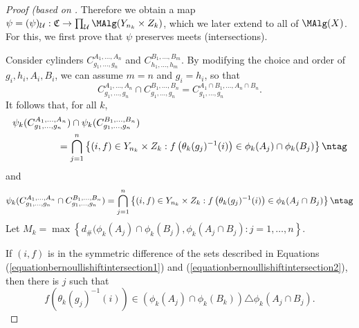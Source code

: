 \begin{proof}[Proof (based on \cite{ozawasoficnotes}]
Therefore we obtain a map $\psi=(\psi)_\mathcal{U}:\mathfrak{C}\to\prod_\mathcal{U}\MAlg(Y_{n_k}\times Z_k)$, which we later extend to all of $\MAlg(X)$. For this, we first prove that $\psi$ preserves meets (intersections).


Consider cylinders $C_{g_1,\ldots,g_n}^{A_1,\ldots,A_n}$ and $C_{h_1,\ldots,h_m}^{B_1,\ldots,B_m}$. By modifying the choice and order of $g_i,h_i,A_i,B_i$, we can assume $m=n$ and $g_i=h_i$, so that
\[C_{g_1,\ldots,g_n}^{A_1,\ldots,A_n}\cap C_{g_1,\ldots,g_n}^{B_1,\ldots,B_n}=C_{g_1,\ldots,g_n}^{A_1\cap B_1,\ldots,A_n\cap B_n}.\]
It follows that, for all $k$,
\begin{align*}
\psi_k(C_{g_1,\ldots,g_n}^{A_1,\ldots,A_n})\cap\psi_k(C_{g_1,\ldots,g_n}^{B_1,\ldots,B_n})\hspace{-3cm}&\hspace{3cm}\\
&=\bigcap_{j=1}^n\left\{(i,f)\in Y_{n_k}\times Z_k:f\left(\theta_k(g_j)^{-1}(i)\right)\in\phi_k(A_j)\cap\phi_k(B_j)\right\}\ntag\label{equationbernoullishiftintersection1}
\end{align*}
and
\[\psi_k(C_{g_1,\ldots,g_n}^{A_1,\ldots,A_n}\cap C_{g_1,\ldots,g_n}^{B_1,\ldots,B_n})=\bigcap_{j=1}^n\left\{(i,f)\in Y_{n_k}\times Z_k:f\left(\theta_k(g_j)^{-1}(i)\right)\in\phi_k(A_j\cap B_j)\right\}\ntag\label{equationbernoullishiftintersection2}\]
Let $M_k=\max\left\{d_\#(\phi_k(A_j)\cap\phi_k(B_j),\phi_k(A_j\cap B_j):j=1,\ldots,n\right\}$.

If $(i,f)$ is in the symmetric difference of the sets described in Equations (\ref{equationbernoullishiftintersection1}) and (\ref{equationbernoullishiftintersection2}), then there is $j$ such that
\[f(\theta_k(g_j)^{-1}(i))\in(\phi_k(A_j)\cap\phi_k(B_k))\triangle\phi_k(A_j\cap B_j).\]


\end{proof}
